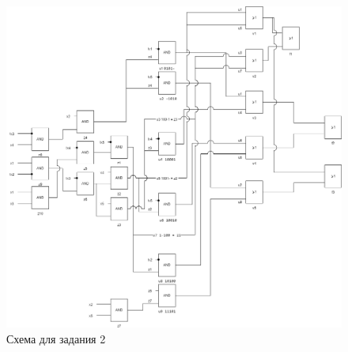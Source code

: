 \begin{figure}
\centering
\includegraphics{./files/task2.png}
\caption{Схема для задания 2}
\end{figure}
